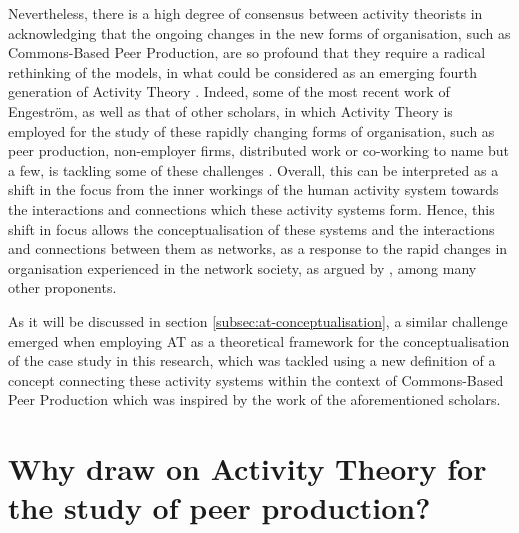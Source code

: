 Nevertheless, there is a high degree of consensus between activity theorists in acknowledging that the ongoing changes in the new forms of organisation, such as Commons-Based Peer Production, are so profound that they require a radical rethinking of the models, in what could be considered as an emerging fourth generation of Activity Theory \parencite[306-310]{engestrom_future_2009}. Indeed, some of the most recent work of Engestr{\"o}m, as well as that of other scholars, in which Activity Theory is employed for the study of these rapidly changing forms of organisation, such as peer production, non-employer firms, distributed work or co-working to name but a few, is tackling some of these challenges \parencite[e.g.][]{engestrom2016using, spinuzzi2014nonemployer, dochy2011inter}. Overall, this can be interpreted as a shift in the focus from the inner workings of the human activity system towards the interactions and connections which these activity systems form. Hence, this shift in focus allows the conceptualisation of these systems and the interactions and connections between them as networks, as a response to the rapid changes in organisation experienced in the network society, as argued by \textcite{castells2011rise}, among many other proponents.

As it will be discussed in section \ref{subsec:at-conceptualisation}, a similar challenge emerged when employing AT as a theoretical framework for the conceptualisation of the case study in this research, which was tackled using a new definition of a concept connecting these activity systems within the context of Commons-Based Peer Production which was inspired by the work of the aforementioned scholars.

\section{Why draw on Activity Theory for the study of peer production?}
\label{subsec:why-at}

